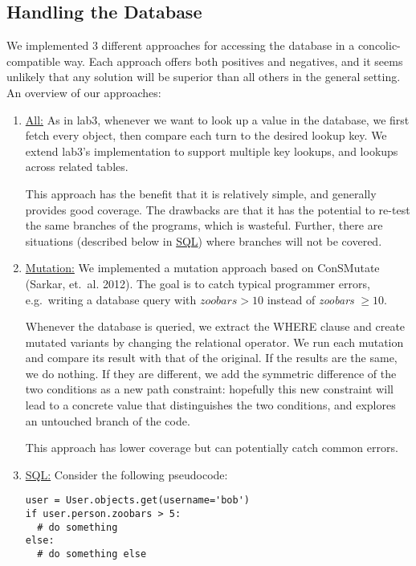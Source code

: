 \documentclass{scrartcl}
\begin{document}
\subsection{Handling the Database}
We implemented 3 different approaches for accessing the database in a
concolic-compatible way. Each approach offers both positives and negatives, and it
seems unlikely that any solution will be superior than all others in the general
setting. An overview of our approaches:

\begin{enumerate}
\item \underline{All:} As in lab3, whenever we want to look up a value
in the database, we first fetch every object, then compare each turn to the
desired lookup key. We extend lab3's implementation to support multiple key
lookups, and lookups across related tables.

This approach has the benefit that it is relatively simple, and generally
provides good coverage. The drawbacks are that it has the potential to re-test
the same branches of the programs, which is wasteful. Further, there are
situations (described below in \underline{SQL}) where branches will not be
covered.

\item \underline{Mutation:}
We implemented a mutation approach based on ConSMutate (Sarkar, et.\ al. 2012).
The goal is to catch typical programmer errors, e.g.\ writing a database
query with $\textit{zoobars} > 10$ instead of \textit{zoobars }$ \geq 10$.

Whenever the database is queried, we extract the WHERE clause and create mutated
variants by changing the relational operator. We run each mutation and compare
its result with that of the original. If the results are the same, we do
nothing. If they are different, we add the symmetric difference of the two
conditions as a new path constraint: hopefully this new constraint will
lead to a concrete value that distinguishes the two conditions, and explores an
untouched branch of the code.

This approach has lower coverage but can potentially catch common errors.

\item \underline{SQL:} Consider the following pseudocode:

\begin{verbatim}
user = User.objects.get(username='bob')
if user.person.zoobars > 5:
  # do something
else:
  # do something else
\end{verbatim}


\end{enumerate}
\end{document}
